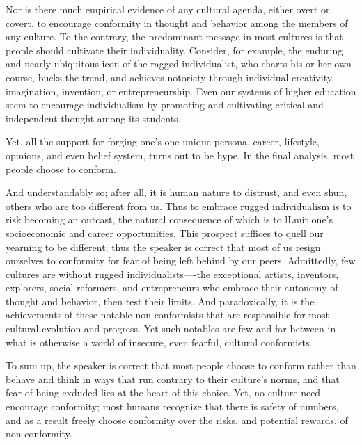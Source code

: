 Nor is there much empirical evidence of any cultural agenda, either overt or covert, to encourage conformity in thought and behavior among the members of any culture.
To the contrary, the predominant message in most cultures is that people should cultivate their individuality.
Consider, for example, the enduring and nearly ubiquitous icon of the ragged individualist, who charts his or her own course, bucks the trend, and achieves notoriety through individual creativity, imagination, invention, or entrepreneurship.
Even our systems of higher education seem to encourage individualism by promoting and cultivating critical and independent thought among its students.


Yet, all the support for forging one's one unique persona, career, lifestyle, opinions, and even belief system, turns out to be hype.
In the final analysis, most people choose to conform.


And understandably so; after all, it is human nature to distrust, and even shun, others who are too different from us.
Thus to embrace rugged individualism is to risk becoming an outcast, the natural consequence of which is to lLmit one's socioeconomic and career opportunities.
This prospect suffices to quell our yearning to be different; thus the speaker is correct that most of us resign ourselves to conformity for fear of being left behind by our peers.
Admittedly, few cultures are without rugged individualists----the exceptional artists, inventors, explorers, social reformers, and entrepreneurs who embrace their autonomy of thought and behavior, then test their limits.
And paradoxically, it is the achievements of these notable non-conformists that are responsible for most cultural evolution and progress.
Yet such notables are few and far between in what is otherwise a world of insecure, even fearful, cultural conformists.


To sum up, the speaker is correct that most people choose to conform rather than behave and think in ways that run contrary to their culture's norms, and that fear of being exduded lies at the heart of this choice.
Yet, no culture need encourage conformity; most humans recognize that there is safety of numbers, and as a result freely choose conformity over the risks, and potential rewards, of non-conformity.
